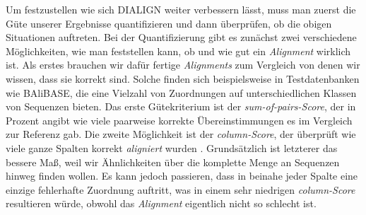 Um festzustellen wie sich DIALIGN weiter verbessern lässt, muss man zuerst die Güte unserer Ergebnisse quantifizieren und dann überprüfen, ob die obigen Situationen auftreten. Bei der Quantifizierung gibt es zunächst zwei verschiedene Möglichkeiten, wie man feststellen kann, ob und wie gut ein \emph{Alignment} wirklich ist. Als erstes brauchen wir dafür fertige \emph{Alignments} zum Vergleich von denen wir wissen, dass sie korrekt sind. Solche finden sich beispielsweise in Testdatenbanken wie BAliBASE, die eine Vielzahl von Zuordnungen auf unterschiedlichen Klassen von Sequenzen bieten. Das erste Gütekriterium ist der \emph{sum-of-pairs-Score}, der in Prozent angibt wie viele paarweise korrekte Übereinstimmungen es im Vergleich zur Referenz gab. Die zweite Möglichkeit ist der \emph{column-Score}, der überprüft wie viele ganze Spalten korrekt \emph{aligniert} wurden \citep{mpps06}. Grundsätzlich ist letzterer das bessere Maß, weil wir Ähnlichkeiten über die komplette Menge an Sequenzen hinweg finden wollen. Es kann jedoch passieren, dass in beinahe jeder Spalte eine einzige fehlerhafte Zuordnung auftritt, was in einem sehr niedrigen \emph{column-Score} resultieren würde, obwohl das \emph{Alignment} eigentlich nicht so schlecht ist.

